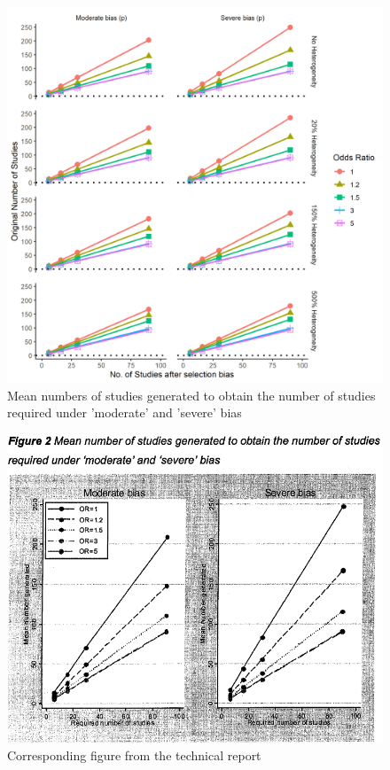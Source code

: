\documentclass[
  english,
  doc,floatsintext,draftall]{apa6}
\begin{document}
\begin{figure}
\includegraphics[width=400pt]{../figures/studies_generated} \caption{Mean numbers of studies generated to obtain the number of studies required under 'moderate' and 'severe' bias}\label{fig:unnamed-chunk-1}
\end{figure}

\begin{figure}
\includegraphics[width=400pt]{../data/figure_2} \caption{Corresponding figure from the technical report}\label{fig:unnamed-chunk-2}
\end{figure}
\end{document}
